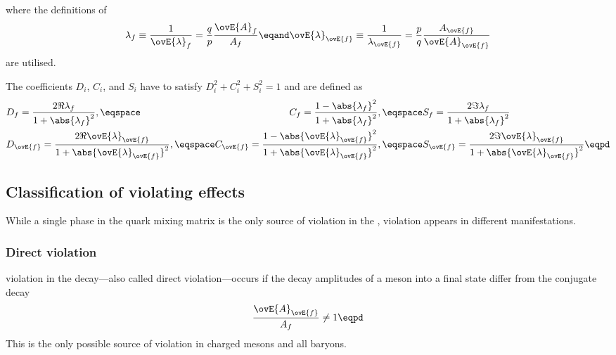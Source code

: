 %
where the definitions of
%
\begin{equation}\label{eq:cpv_theory:flavour_physics:time_evolution:lambdaf}
  \lambda_f               \equiv \frac{1}{\ovE{\lambda}_f}   = \frac{q}{p} \frac{\ovE{A}_f}{A_f} \eqand 
  \ovE{\lambda}_{\ovE{f}} \equiv \frac{1}{\lambda_{\ovE{f}}} = \frac{p}{q} \frac{A_{\ovE{f}}}{\ovE{A}_{\ovE{f}}}
\end{equation}
%
are utilised.

The \CP coefficients $D_i$, $C_i$, and $S_i$ have to satisfy $D_i^2 + C_i^2 +
S_i^2 = 1$ and are defined as
%
\begin{equation}
  \begin{alignedat}{2}
    &D_f = \frac{2 \Re \lambda_f}{1+\abs{\lambda_f}^2}, \eqspace 
    &C_f = \frac{1 - \abs{\lambda_f}^2}{1 + \abs{\lambda_f}^2}, \eqspace 
    &S_f = \frac{2 \Im \lambda_f}{1+\abs{\lambda_f}^2} \\
    &D_{\ovE{f}} = \frac{2 \Re \ovE{\lambda}_{\ovE{f}}}{1+\abs{\ovE{\lambda}_{\ovE{f}}}^2}, \eqspace 
    &C_{\ovE{f}} = \frac{1 - \abs{\ovE{\lambda}_{\ovE{f}}}^2}{1 + \abs{\ovE{\lambda}_{\ovE{f}}}^2}, \eqspace 
    &S_{\ovE{f}} = \frac{2 \Im \ovE{\lambda}_{\ovE{f}}}{1+\abs{\ovE{\lambda}_{\ovE{f}}}^2}\eqpd \\
  \end{alignedat}
\end{equation}
%

\subsection[Classification of \CP violating effects]{Classification of \CPbfsf violating effects}
\label{sec:cpv_theory:flavour_physics:cpv_classification}

While a single phase in the \CKM quark mixing matrix is the only source of \CP
violation in the \SM, \CP violation appears in different manifestations.

\subsubsection[Direct \CP violation]{Direct \CPbfsf violation}
\label{sec:cpv_theory:flavour_physics:cpv_classification:direct}

\CP violation in the decay---also called direct \CP violation---occurs if the
decay amplitudes of a meson into a final state differ from the \CP conjugate
decay
%
\begin{equation}
  \frac{\ovE{A}_{\ovE{f}}}{A_f} \neq 1 \eqpd
\end{equation}
%
This is the only possible source of \CP violation in charged mesons and all
baryons.

